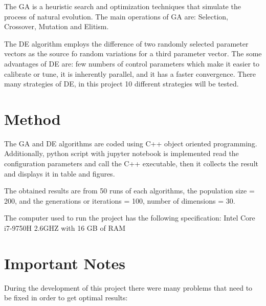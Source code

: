 \documentclass[12pt]{article}
\begin{document}
    The GA is a heuristic search and optimization techniques that simulate the process of natural evolution. The main operations of GA are: Selection, Crossover, Mutation and Elitism.
    
    The DE algorithm employs the difference of two randomly selected parameter vectors as the source fo random variations for a third parameter vector. The some advantages of DE are: few numbers of control parameters which make it easier to calibrate or tune, it is inherently parallel, and it has a faster convergence. 
    There many strategies of DE, in this project 10 different strategies will be tested.
     


    
    \section{Method}
    
    The GA and DE algorithms are coded using C++ object oriented programming. Additionally,
    python script with jupyter notebook is implemented read the configuration parameters and call the C++ executable, then it collects the result and displays it in table and figures.
    
    The obtained results are from 50 runs of each algorithms, the population size = 200, and the generations or iterations = 100, number of dimensions = 30.

The computer used to run the project has the following specification: Intel Core i7-9750H 2.6GHZ with 16 GB of RAM

  
      
    



\section{Important Notes}

During the development of this project there were many problems that need to be fixed in order to get optimal results:
\end{document}
